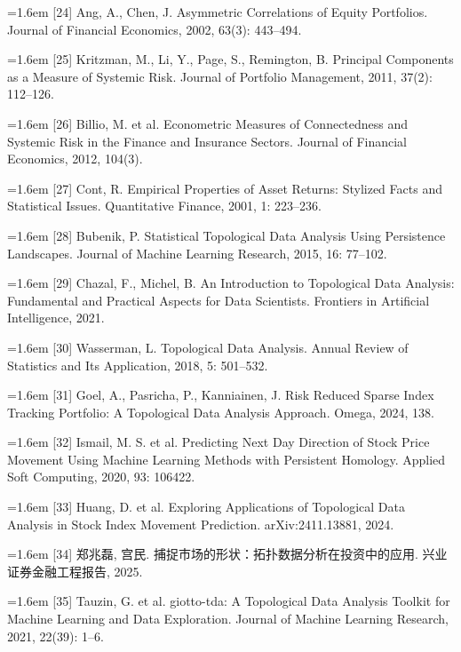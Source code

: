 \documentclass[12pt,a4paper]{ctexart}
\begin{document}
\noindent\hangindent=1.6em [24] Ang, A., Chen, J. Asymmetric Correlations of Equity Portfolios. Journal of Financial Economics, 2002, 63(3): 443–494.\par
\noindent\hangindent=1.6em [25] Kritzman, M., Li, Y., Page, S., Remington, B. Principal Components as a Measure of Systemic Risk. Journal of Portfolio Management, 2011, 37(2): 112–126.\par
\noindent\hangindent=1.6em [26] Billio, M. et al. Econometric Measures of Connectedness and Systemic Risk in the Finance and Insurance Sectors. Journal of Financial Economics, 2012, 104(3).\par
\noindent\hangindent=1.6em [27] Cont, R. Empirical Properties of Asset Returns: Stylized Facts and Statistical Issues. Quantitative Finance, 2001, 1: 223–236.\par
\noindent\hangindent=1.6em [28] Bubenik, P. Statistical Topological Data Analysis Using Persistence Landscapes. Journal of Machine Learning Research, 2015, 16: 77–102.\par
\noindent\hangindent=1.6em [29] Chazal, F., Michel, B. An Introduction to Topological Data Analysis: Fundamental and Practical Aspects for Data Scientists. Frontiers in Artificial Intelligence, 2021.\par
\noindent\hangindent=1.6em [30] Wasserman, L. Topological Data Analysis. Annual Review of Statistics and Its Application, 2018, 5: 501–532.\par
\noindent\hangindent=1.6em [31] Goel, A., Pasricha, P., Kanniainen, J. Risk Reduced Sparse Index Tracking Portfolio: A Topological Data Analysis Approach. Omega, 2024, 138.\par
\noindent\hangindent=1.6em [32] Ismail, M. S. et al. Predicting Next Day Direction of Stock Price Movement Using Machine Learning Methods with Persistent Homology. Applied Soft Computing, 2020, 93: 106422.\par
\noindent\hangindent=1.6em [33] Huang, D. et al. Exploring Applications of Topological Data Analysis in Stock Index Movement Prediction. arXiv:2411.13881, 2024.\par
\noindent\hangindent=1.6em [34] 郑兆磊, 宫民. 捕捉市场的形状：拓扑数据分析在投资中的应用. 兴业证券金融工程报告, 2025.\par
\noindent\hangindent=1.6em [35] Tauzin, G. et al. giotto-tda: A Topological Data Analysis Toolkit for Machine Learning and Data Exploration. Journal of Machine Learning Research, 2021, 22(39): 1–6.\par
\end{document}
